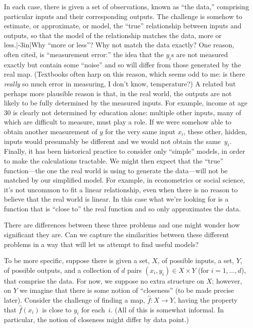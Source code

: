 \documentclass[10pt, a4paper]{article}
\begin{document}
In each case, there is given a set of observations, known as “the
data,” comprising particular inputs and their corresponding
outputs. The challenge is somehow to estimate, or approximate, or
model, the “true” relationship between inputs and outputs, so that the
model of the relationship matches the data, more or
less.\sidenote|-3in|{Why “more or less”? Why not match the data
  exactly? One reason, often cited, is “measurement error:” the idea
  that the $y_i$s are not measured exactly but contain some “noise”
  and so will differ from those generated by the real map. (Textbooks
  often harp on this reason, which seems odd to me: is there
  \emph{really} so much error in measuring, I don't know,
  temperature?)\sidepar%
  A related but perhaps more plausible reason is that, in the real
  world, the outputs are not likely to be fully determined by the
  measured inputs. For example, income at age 30 is clearly not
  determined by education alone: multiple other inputs, many of which
  are difficult to measure, must play a role. If we were somehow able
  to obtain another measurement of $y$ for the very same input $x_i$,
  these other, hidden, inputs would presumably be different and we
  would not obtain the same~$y_i$.\sidepar%
  Finally, it has been historical practice to consider only “simple”
  models, in order to make the calculations tractable. We might then
  expect that the “true” function---the one the real world is using to
  generate the data---will not be matched by our simplified model. For
  example, in econometrics or social science, it's not uncommon to fit
  a linear relationship, even when there is no reason to believe that
  the real world is linear. In this case what we're looking for is a
  function that is “close to” the real function and so only
  approximates the data.}

There are differences between these three problems and one might
wonder how significant they are. Can we capture the similarities
between these different problems in a way that will let us attempt to
find useful models?

To be more specific, suppose there is given a set, $X$, of possible
inputs, a set, $Y$, of possible outputs, and a collection of $d$ pairs
$(x_i, y_i)\in X\times Y$ (for $i=1,\dots,d$), that comprise the data. For
now, we suppose no extra structure on $X$; however, on $Y$ we imagine
that there is some notion of “closeness” (to be made precise
later). Consider the challenge of finding a map,
$\hat{f}\colon X\to Y$, having the property that $\hat{f}(x_i)$ is close
to $y_i$ for each~$i$. (All of this is somewhat informal. In
particular, the notion of closeness might differ by data point.)
\end{document}
